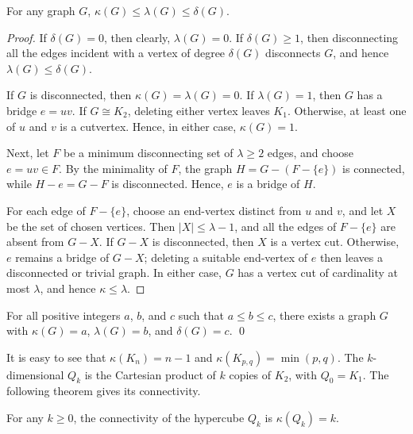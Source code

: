 \begin{Theorem}\label{thm:ConnectivityBounds}
For any graph $G$, $\kappa(G) \le \lambda(G) \le \delta(G)$.
\end{Theorem}

\begin{proof}
If $\delta(G) = 0$, then clearly, $\lambda(G) = 0$. If $\delta(G) \ge 1$, then disconnecting all the edges incident with a vertex of degree $\delta(G)$ disconnects $G$, and hence $\lambda(G) \le \delta(G)$.

If $G$ is disconnected, then $\kappa(G) = \lambda(G) = 0$. If $\lambda(G) = 1$, then $G$ has a bridge $e=uv$. If $G\cong K_2$, deleting either vertex leaves $K_1$. Otherwise, at least one of $u$ and $v$ is a cutvertex. Hence, in either case, $\kappa(G)=1$.

Next, let $F$ be a minimum disconnecting set of $\lambda\ge2$ edges, and choose $e=uv\in F$. By the minimality of $F$, the graph $H=G-(F-\{e\})$ is connected, while $H-e=G-F$ is disconnected. Hence, $e$ is a bridge of $H$.

For each edge of $F-\{e\}$, choose an end-vertex distinct from $u$ and $v$, and let $X$ be the set of chosen vertices. Then $|X|\le\lambda-1$, and all the edges of $F-\{e\}$ are absent from $G-X$. If $G-X$ is disconnected, then $X$ is a vertex cut. Otherwise, $e$ remains a bridge of $G-X$; deleting a suitable end-vertex of $e$ then leaves a disconnected or trivial graph. In either case, $G$ has a vertex cut of cardinality at most $\lambda$, and hence $\kappa\le\lambda$.
\end{proof}

\begin{Theorem}
For all positive integers $a$, $b$, and $c$ such that $a \le b \le c$, there exists a graph $G$ with $\kappa(G) = a$, $\lambda(G) = b$, and $\delta(G) = c$. \qed
\end{Theorem}

It is easy to see that $\kappa(K_n) = n -1$ and $\kappa(K_{p,q}) = \min(p, q)$. The $k$-dimensional  $Q_k$ is the Cartesian product of $k$ copies of $K_2$, with $Q_0=K_1$. The following theorem gives its connectivity.

\begin{Theorem}
For any $k \ge 0$, the connectivity of the hypercube $Q_k$ is $\kappa(Q_k) = k$.
\end{Theorem}

